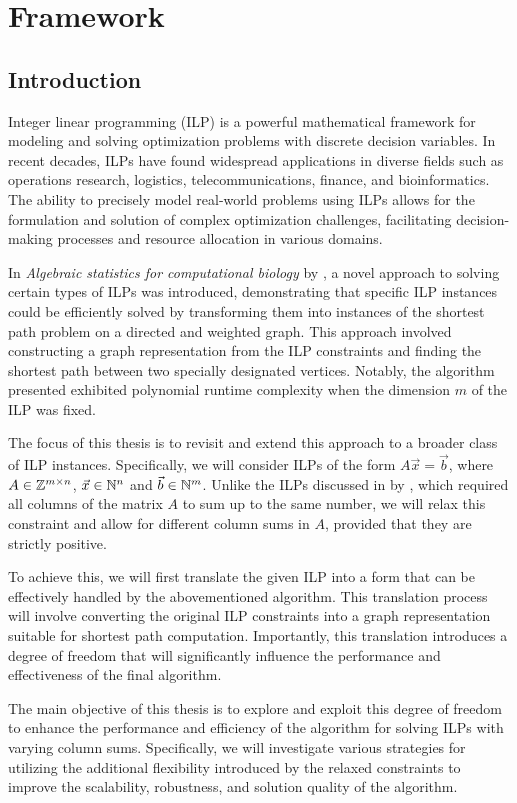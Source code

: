 \chapter{Framework}
\section{Introduction}
Integer linear programming (ILP) is a powerful mathematical framework for modeling and solving optimization problems with discrete decision variables. In recent decades, ILPs have found widespread applications in diverse fields such as operations research, logistics, telecommunications, finance, and bioinformatics. The ability to precisely model real-world problems using ILPs allows for the formulation and solution of complex optimization challenges, facilitating decision-making processes and resource allocation in various domains.

In \textit{Algebraic statistics for computational biology} by \cite{algebraic_statistics}, a novel approach to solving certain types of ILPs was introduced, demonstrating that specific ILP instances could be efficiently solved by transforming them into instances of the shortest path problem on a directed and weighted graph. This approach involved constructing a graph representation from the ILP constraints and finding the shortest path between two specially designated vertices. Notably, the algorithm presented exhibited polynomial runtime complexity when the dimension $m$ of the ILP was fixed.

The focus of this thesis is to revisit and extend this approach to a broader class of ILP instances. Specifically, we will consider ILPs of the form $A\vec x = \vec b$, where $A\in \mathbb{Z}^{m \times n}$,  $\vec x \in \mathbb{N}^n$ and $\vec b \in \mathbb{N}^m$. Unlike the ILPs discussed in by \cite{algebraic_statistics}, which required all columns of the matrix $A$ to sum up to the same number, we will relax this constraint and allow for different column sums in $A$, provided that they are strictly positive.

To achieve this, we will first translate the given ILP into a form that can be effectively handled by the abovementioned algorithm. This translation process will involve converting the original ILP constraints into a graph representation suitable for shortest path computation. Importantly, this translation introduces a degree of freedom that will significantly influence the performance and effectiveness of the final algorithm.

The main objective of this thesis is to explore and exploit this degree of freedom to enhance the performance and efficiency of the algorithm for solving ILPs with varying column sums. Specifically, we will investigate various strategies for utilizing the additional flexibility introduced by the relaxed constraints to improve the scalability, robustness, and solution quality of the algorithm.

